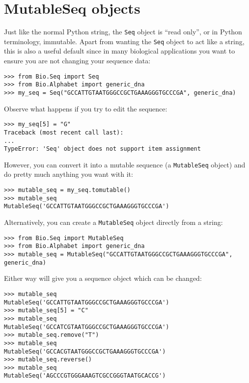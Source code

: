 {\section{MutableSeq objects}
\label{sec:mutable-seq}

Just like the normal Python string, the \verb|Seq| object is ``read only'', or in Python terminology, immutable.  Apart from wanting the \verb|Seq| object to act like a string, this is also a useful default since in many biological applications you want to ensure you are not changing your sequence data:

\begin{verbatim}
>>> from Bio.Seq import Seq
>>> from Bio.Alphabet import generic_dna
>>> my_seq = Seq("GCCATTGTAATGGGCCGCTGAAAGGGTGCCCGA", generic_dna)
\end{verbatim}

Observe what happens if you try to edit the sequence:
\begin{verbatim}
>>> my_seq[5] = "G"
Traceback (most recent call last):
...
TypeError: 'Seq' object does not support item assignment
\end{verbatim}

However, you can convert it into a mutable sequence (a \verb|MutableSeq| object) and do pretty much anything you want with it:

\begin{verbatim}
>>> mutable_seq = my_seq.tomutable()
>>> mutable_seq
MutableSeq('GCCATTGTAATGGGCCGCTGAAAGGGTGCCCGA')
\end{verbatim}

Alternatively, you can create a \verb|MutableSeq| object directly from a string:

\begin{verbatim}
>>> from Bio.Seq import MutableSeq
>>> from Bio.Alphabet import generic_dna
>>> mutable_seq = MutableSeq("GCCATTGTAATGGGCCGCTGAAAGGGTGCCCGA", generic_dna)
\end{verbatim}

Either way will give you a sequence object which can be changed:

\begin{verbatim}
>>> mutable_seq
MutableSeq('GCCATTGTAATGGGCCGCTGAAAGGGTGCCCGA')
>>> mutable_seq[5] = "C"
>>> mutable_seq
MutableSeq('GCCATCGTAATGGGCCGCTGAAAGGGTGCCCGA')
>>> mutable_seq.remove("T")
>>> mutable_seq
MutableSeq('GCCACGTAATGGGCCGCTGAAAGGGTGCCCGA')
>>> mutable_seq.reverse()
>>> mutable_seq
MutableSeq('AGCCCGTGGGAAAGTCGCCGGGTAATGCACCG')
\end{verbatim}

}
